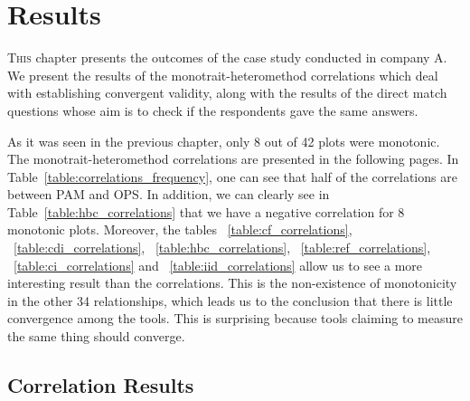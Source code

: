 \chapter{Results}
\label{ch:results}


\lettrine[lines=4, loversize=-0.1, lraise=0.1]{T}{his} chapter presents the outcomes of the case study conducted in company A. We present the results of the monotrait-heteromethod correlations which deal with establishing convergent validity, along with the results of the direct match questions whose aim is to check if the respondents gave the same answers.

As it was seen in the previous chapter, only 8 out of 42 plots were monotonic. The monotrait-heteromethod correlations are presented in the following pages. In Table~\ref{table:correlations_frequency}, one can see that half of the correlations are between \ac{PAM} and \ac{OPS}. In addition, we can clearly see in Table~\ref{table:hbc_correlations} that we have a negative correlation for 8 monotonic plots. Moreover, the tables ~\ref{table:cf_correlations}, ~\ref{table:cdi_correlations}, ~\ref{table:hbc_correlations}, ~\ref{table:ref_correlations}, ~\ref{table:ci_correlations} and ~\ref{table:iid_correlations} allow us to see a more interesting result than the correlations. This is the non-existence of monotonicity in the other 34 relationships, which leads us to the conclusion that there is little convergence among the tools. This is surprising because tools claiming to measure the same thing should converge.  %
\section{Correlation Results}

